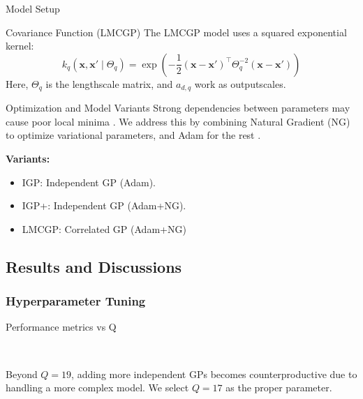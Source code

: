 \begin{frame}{Model Setup}

	\begin{block}{Covariance Function (LMCGP)}
		The LMCGP model uses a squared exponential kernel:
		\begin{equation*}
			k_{q}\left(\mathbf{x}, \mathbf{x'} \mid \Theta_q \right) = \exp\left(-\frac{1}{2}(\mathbf{x} - \mathbf{x'})^\top \Theta_q^{-2} (\mathbf{x} - \mathbf{x'})\right)
		\end{equation*}
		Here, \( \Theta_q \) is the lengthscale matrix, and \( a_{d, q} \) work as outputscales.
	\end{block}
	
	\begin{block}{Optimization and Model Variants}
		Strong dependencies between parameters may cause poor local minima \cite{giraldo2021fully}. We address this by combining Natural Gradient (NG) to optimize variational parameters, and Adam for the rest \cite{pmlr-v84-salimbeni18a}.

		\textbf{Variants:}
		\begin{itemize}
			\item IGP: Independent GP (Adam).
			\item IGP+: Independent GP (Adam+NG).
			\item LMCGP: Correlated GP (Adam+NG)
		\end{itemize}
	\end{block}
\end{frame}



\subsection{Results and Discussions}

\subsubsection{Hyperparameter Tuning}

\begin{frame}{Performance metrics vs Q}
	\begin{figure}[htbp]
	\tiny
	\centering
	\setlength{} 
	\setlength{}
	
	\subfloat[MSE]{}\hspace{-0.1em}
	\subfloat[MSLL]{}\\
	\vspace{-0.1em} %
	
	\subfloat[CRPS]{}\hspace{-0.1em}
	\subfloat[NLPD]{}
	\end{figure}
	\vspace{-1em}
	\begin{block}{}
	 Beyond $Q=19$, adding more independent GPs becomes counterproductive due to handling a more complex model. We select $Q=17$ as the proper parameter.
	\end{block}
\end{frame}

